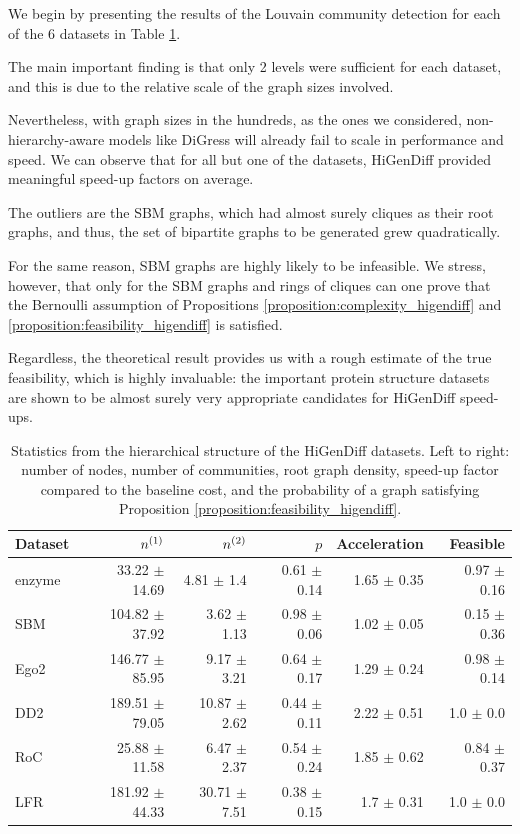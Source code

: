 We begin by presenting the results of the Louvain community detection for each of the 6 datasets in Table \ref{tab:higendiff_datasets}. 

The main important finding is that only 2 levels were sufficient for each dataset, and this is due to the relative scale of the graph sizes involved. 

Nevertheless, with graph sizes in the hundreds, as the ones we considered, non-hierarchy-aware models like DiGress will already fail to scale in performance and speed. We can observe that for all but one of the datasets, HiGenDiff provided meaningful speed-up factors on average. 

The outliers are the SBM graphs, which had almost surely cliques as their root graphs, and thus, the set of bipartite graphs to be generated grew quadratically.

For the same reason, SBM graphs are highly likely to be infeasible. We stress, however, that only for the SBM graphs and rings of cliques can one prove that the Bernoulli assumption of Propositions \ref{proposition:complexity_higendiff} and \ref{proposition:feasibility_higendiff} is satisfied. 

Regardless, the theoretical result provides us with a rough estimate of the true feasibility, which is highly invaluable: the important protein structure datasets are shown to be almost surely very appropriate candidates for HiGenDiff speed-ups.

\begin{table}[H]
    \centering
    \caption[Statistics from the hierarchical structure of the HiGenDiff datasets.]{Statistics from the hierarchical structure of the HiGenDiff datasets. Left to right: number of nodes, number of communities, root graph density, speed-up factor compared to the baseline cost, and the probability of a graph satisfying Proposition \ref{proposition:feasibility_higendiff}.}
    \label{tab:higendiff_datasets}
\begin{tabular}{lrrrrr}
\toprule
Dataset & $n^{\mathopen{}\left(1\right)}$ & $n^{\mathopen{}\left(2\right)}$ & $p$ & Acceleration & Feasible \\
\midrule
enzyme & 33.22 $\pm$ 14.69 & 4.81 $\pm$ 1.4 & 0.61 $\pm$ 0.14 & 1.65 $\pm$ 0.35 & 0.97 $\pm$ 0.16 \\
SBM & 104.82 $\pm$ 37.92 & 3.62 $\pm$ 1.13 & 0.98 $\pm$ 0.06 & 1.02 $\pm$ 0.05 & 0.15 $\pm$ 0.36 \\
Ego2 & 146.77 $\pm$ 85.95 & 9.17 $\pm$ 3.21 & 0.64 $\pm$ 0.17 & 1.29 $\pm$ 0.24 & 0.98 $\pm$ 0.14 \\
DD2 & 189.51 $\pm$ 79.05 & 10.87 $\pm$ 2.62 & 0.44 $\pm$ 0.11 & 2.22 $\pm$ 0.51 & 1.0 $\pm$ 0.0 \\
RoC & 25.88 $\pm$ 11.58 & 6.47 $\pm$ 2.37 & 0.54 $\pm$ 0.24 & 1.85 $\pm$ 0.62 & 0.84 $\pm$ 0.37 \\
LFR & 181.92 $\pm$ 44.33 & 30.71 $\pm$ 7.51 & 0.38 $\pm$ 0.15 & 1.7 $\pm$ 0.31 & 1.0 $\pm$ 0.0 \\
\bottomrule
\end{tabular}
\end{table}

